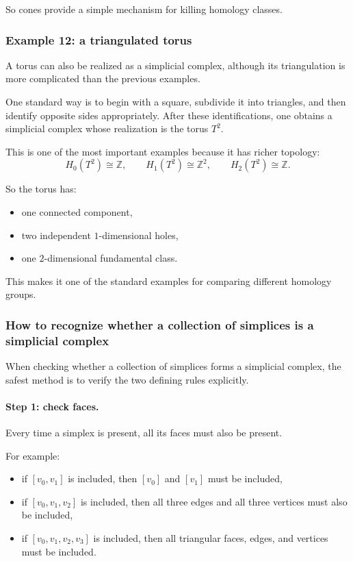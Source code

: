 \documentclass[12pt,a4paper]{article}
\theoremstyle{notespace}
\begin{document}
So cones provide a simple mechanism for killing homology classes.

\subsubsection{Example 12: a triangulated torus}

A torus can also be realized as a simplicial complex, although its triangulation is more complicated than the previous examples.

One standard way is to begin with a square, subdivide it into triangles, and then identify opposite sides appropriately. After these identifications, one obtains a simplicial complex whose realization is the torus \(T^2\).

This is one of the most important examples because it has richer topology:
\[
H_0(T^2)\cong \mathbb{Z},\qquad
H_1(T^2)\cong \mathbb{Z}^2,\qquad
H_2(T^2)\cong \mathbb{Z}.
\]

So the torus has:
\begin{itemize}
	\item one connected component,
	\item two independent \(1\)-dimensional holes,
	\item one \(2\)-dimensional fundamental class.
\end{itemize}

This makes it one of the standard examples for comparing different homology groups.

\subsubsection{How to recognize whether a collection of simplices is a simplicial complex}

When checking whether a collection of simplices forms a simplicial complex, the safest method is to verify the two defining rules explicitly.

\paragraph{Step 1: check faces.}
Every time a simplex is present, all its faces must also be present.

For example:
\begin{itemize}
	\item if \([v_0,v_1]\) is included, then \([v_0]\) and \([v_1]\) must be included,
	\item if \([v_0,v_1,v_2]\) is included, then all three edges and all three vertices must also be included,
	\item if \([v_0,v_1,v_2,v_3]\) is included, then all triangular faces, edges, and vertices must be included.
\end{itemize}
\end{document}
